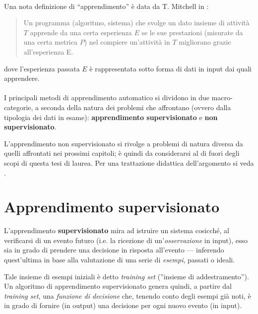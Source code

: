 \paragraph{}
Una nota definizione di ``apprendimento'' è data da T. Mitchell in \cite{mitchell97}:
\begin{quote}
	Un programma (algoritmo, sistema) che svolge un dato insieme di attività $T$ apprende da una certa esperienza $E$ se le sue prestazioni (misurate da una certa metrica $P$) nel compiere un'attività in $T$ migliorano grazie all'esperienza E.
\end{quote}
dove l'esperienza passata $E$ è rappresentata sotto forma di dati in input dai quali apprendere.
		
\paragraph{}
I principali metodi di apprendimento automatico si dividono in due macro-categorie, a seconda della natura dei
problemi che affrontano (ovvero dalla tipologia dei dati in esame): \textbf{apprendimento supervisionato} e \textbf{non supervisionato}.

L'apprendimento non supervisionato si rivolge a problemi di natura diversa da quelli affrontati nei prossimi capitoli; è quindi da considerarsi al di fuori degli scopi di questa tesi di laurea. Per una trattazione didattica dell'argomento si veda \cite{bing2011}.


	
\section{Apprendimento supervisionato}
L'apprendimento \textbf{supervisionato} mira ad istruire un sistema cosicché, al verificarsi di un evento futuro (i.e. la ricezione di un'\textit{osservazione} in input), esso sia in grado di prendere una decisione in risposta all'evento --- inferendo quest'ultima in base alla valutazione di una serie di \textit{esempi}, passati o ideali.
		
Tale insieme di esempi iniziali è detto \textit{training set} (''insieme di addestramento'').	Un algoritmo di apprendimento supervisionato genera quindi, a partire dal \textit{training set}, una \emph{funzione di decisione} che, tenendo conto degli esempi già noti, è in grado di fornire (in output) una decisione per ogni nuovo evento (in input).
		
